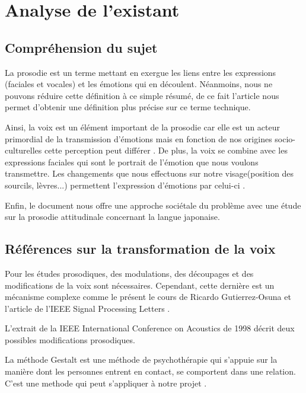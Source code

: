 \chapter{Analyse de l'existant}

\section{Compréhension du sujet}\label{comprehension_sujet}

La prosodie est un terme mettant en exergue les liens entre les expressions (faciales et vocales) et les émotions qui en découlent. Néanmoins, nous ne pouvons réduire cette définition à ce simple résumé, de ce fait l'article \cite{bachorowski1999vocal} nous permet d'obtenir une définition plus précise sur ce terme technique.

Ainsi, la voix est un élément important de la prosodie car elle est un acteur primordial de la transmission d'émotions mais en fonction de nos origines socio-culturelles cette perception peut différer \cite{auberge2002prosodie}.
De plus, la voix se combine avec les expressions faciales qui sont le portrait de l'émotion que nous voulons transmettre. Les changements que nous effectuons sur notre visage(position des sourcils, lèvres...) permettent l'expression d'émotions par celui-ci \cite{ekman2003unmasking} .

Enfin, le document \cite{fourer:hal-00992083} nous offre une approche sociétale du problème avec une étude sur la prosodie attitudinale concernant la langue japonaise.


\section{Références sur la transformation de la voix}\label{ref_transfo_voix}

Pour les études prosodiques, des modulations, des découpages et des modifications de la voix sont nécessaires. Cependant, cette dernière est un mécanisme complexe comme le présent le cours de Ricardo Gutierrez-Osuna \cite{Gutierrez-Osuna:ISP-PMS} et l'article de l'IEEE Signal Processing Letters \cite{haagen1994transformation}.

L'extrait de la IEEE International Conference on Acoustics de 1998 \cite{Acero:ICASSP98-II-881} décrit deux possibles modifications prosodiques.

La méthode Gestalt est une méthode de psychothérapie qui s'appuie sur la manière dont les personnes entrent en contact, se comportent dans une relation. C'est une methode qui peut s'appliquer à notre projet \cite{auberge2002gestalt}.

